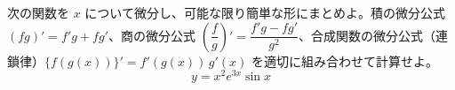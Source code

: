 
次の関数を $x$ について微分し、可能な限り簡単な形にまとめよ。積の微分公式 $(fg)' = f'g + fg'$、商の微分公式 $\left(\dfrac{f}{g}\right)' = \dfrac{f'g - fg'}{g^{2}}$、合成関数の微分公式（連鎖律）$\{f(g(x))\}' = f'(g(x))\,g'(x)$ を適切に組み合わせて計算せよ。
\[
y = x^{2} e^{3x} \sin x
\]
